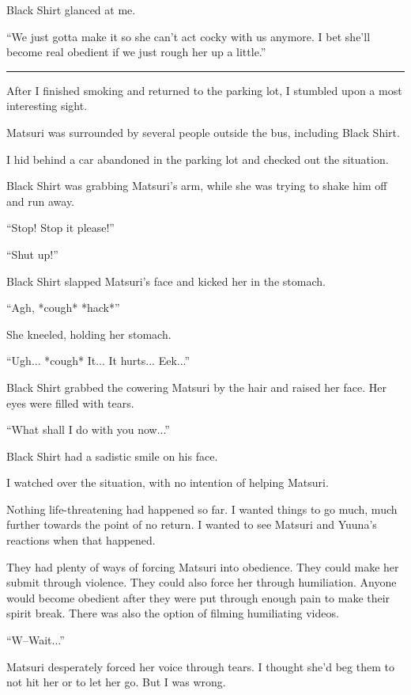 Black Shirt glanced at me.

``We just gotta make it so she can't act cocky with us anymore. I bet she'll become real obedient if we just rough her up a little.''

\vspace{\baselineskip}
\hrule
\vspace{\baselineskip}

After I finished smoking and returned to the parking lot, I stumbled upon a most interesting sight.

Matsuri was surrounded by several people outside the bus, including Black Shirt.

I hid behind a car abandoned in the parking lot and checked out the situation.

Black Shirt was grabbing Matsuri's arm, while she was trying to shake him off and run away.

``Stop! Stop it please!''

``Shut up!''

Black Shirt slapped Matsuri's face and kicked her in the stomach.

``Agh, *cough* *hack*''

She kneeled, holding her stomach.

``Ugh... *cough* It... It hurts... Eek...''

Black Shirt grabbed the cowering Matsuri by the hair and raised her face. Her eyes were filled with tears.

``What shall I do with you now...''

Black Shirt had a sadistic smile on his face.

I watched over the situation, with no intention of helping Matsuri.

Nothing life-threatening had happened so far. I wanted things to go much, much further towards the point of no return. I wanted to see Matsuri and Yuuna's reactions when that happened.

They had plenty of ways of forcing Matsuri into obedience. They could make her submit through violence. They could also force her through humiliation. Anyone would become obedient after they were put through enough pain to make their spirit break. There was also the option of filming humiliating videos.

``W--Wait...''

Matsuri desperately forced her voice through tears. I thought she'd beg them to not hit her or to let her go. But I was wrong.

